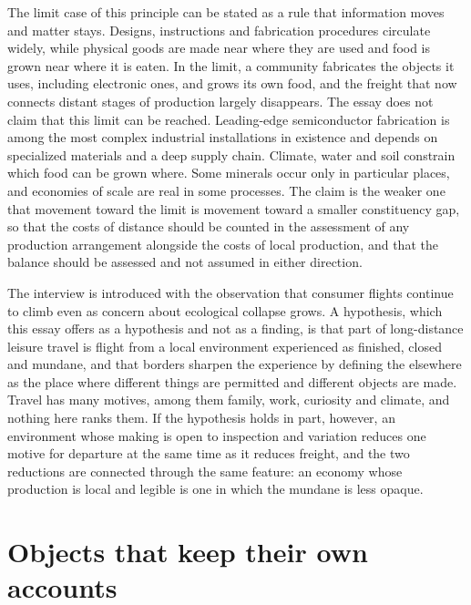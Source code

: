 \documentclass[12pt]{article}
\theoremstyle{definition}
\begin{document}
The limit case of this principle can be stated as a rule that information moves and matter stays. Designs, instructions and fabrication procedures circulate widely, while physical goods are made near where they are used and food is grown near where it is eaten. In the limit, a community fabricates the objects it uses, including electronic ones, and grows its own food, and the freight that now connects distant stages of production largely disappears. The essay does not claim that this limit can be reached. Leading-edge semiconductor fabrication is among the most complex industrial installations in existence and depends on specialized materials and a deep supply chain. Climate, water and soil constrain which food can be grown where. Some minerals occur only in particular places, and economies of scale are real in some processes. The claim is the weaker one that movement toward the limit is movement toward a smaller constituency gap, so that the costs of distance should be counted in the assessment of any production arrangement alongside the costs of local production, and that the balance should be assessed and not assumed in either direction.

The interview is introduced with the observation that consumer flights continue to climb even as concern about ecological collapse grows. A hypothesis, which this essay offers as a hypothesis and not as a finding, is that part of long-distance leisure travel is flight from a local environment experienced as finished, closed and mundane, and that borders sharpen the experience by defining the elsewhere as the place where different things are permitted and different objects are made. Travel has many motives, among them family, work, curiosity and climate, and nothing here ranks them. If the hypothesis holds in part, however, an environment whose making is open to inspection and variation reduces one motive for departure at the same time as it reduces freight, and the two reductions are connected through the same feature: an economy whose production is local and legible is one in which the mundane is less opaque.

\section{Objects that keep their own accounts}\label{sec:objects}
\end{document}
